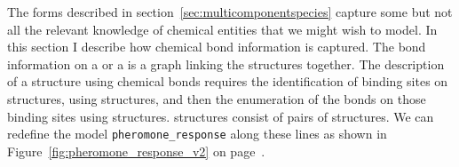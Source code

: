 \documentclass{cekarticle}
\begin{document}
The forms described in section~\ref{sec:multicomponentspecies} capture some but not all
the relevant knowledge of chemical entities that we might wish to model.  In this section I
describe how chemical bond information is captured.
The bond information on a  or a  is a
graph linking the  structures together.
The description of a structure using chemical
bonds requires the identification of binding sites on  structures, using
 structures, and
then the enumeration of the bonds on those binding sites using  structures.
 structures consist of pairs of  structures.
We can redefine the model
\texttt{pheromone\_response} along these lines as shown in Figure~\ref{fig:pheromone_response_v2} on
page~\pageref{fig:pheromone_response_v2}.
\end{document}
